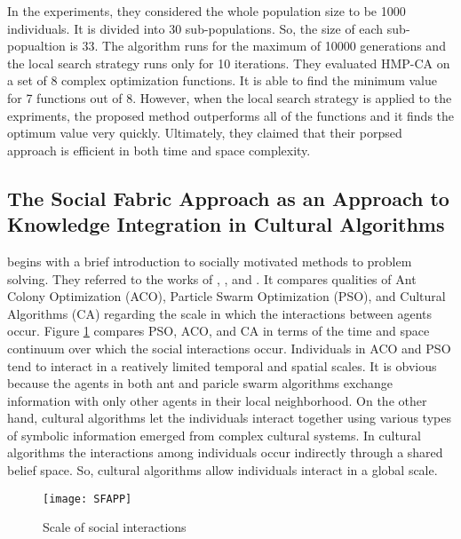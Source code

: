 In the experiments, they considered the whole population size to be 1000 individuals. It is divided into 30 sub-populations. So, the size of each sub-popualtion is 33. The algorithm runs for the maximum of 10000 generations and the local search strategy runs only for 10 iterations. They evaluated HMP-CA on a set of 8 complex optimization functions. It is able to find the minimum value for 7 functions out of 8. However, when the local search strategy is applied to the expriments, the proposed method outperforms all of the functions and it finds the optimum value very quickly. Ultimately, they claimed that their porpsed approach is efficient in both time and space complexity.

\subsection{The Social Fabric Approach as an Approach to Knowledge Integration in Cultural Algorithms}	
\cite{reynolds2008social} begins with a brief introduction to socially motivated methods to problem solving. They referred to the works of \cite{hu2003engineering}, \cite{reynolds2007exploring}, and \cite{cheng2005weaving}. It compares qualities of Ant Colony Optimization (ACO), Particle Swarm Optimization (PSO), and Cultural Algorithms (CA) regarding the scale in which the interactions between agents occur. Figure \ref{fig:SFAPP} compares PSO, ACO, and CA in terms of the time and space continuum over which the social interactions occur. Individuals in ACO and PSO tend to interact in a reatively limited temporal and spatial scales. It is obvious because the agents in both ant and paricle swarm algorithms exchange information with only other agents in their local neighborhood. On the other hand, cultural algorithms let the individuals interact together using various types of symbolic information emerged from complex cultural systems. In cultural algorithms the interactions among individuals occur indirectly through a shared belief space. So, cultural algorithms allow individuals interact in a global scale.
\begin{figure}[h]
	\texttt{[image: SFAPP]}
	\centering
	\caption{Scale of social interactions\cite{kobti2013heterogeneous}}
	\label{fig:SFAPP}
\end{figure}
